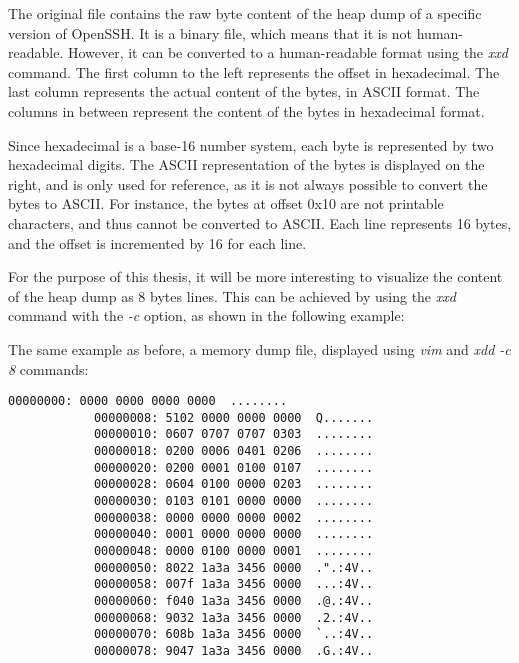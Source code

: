     The original file contains the raw byte content of the heap dump of a specific version of OpenSSH. It is a binary file, which means that it is not human-readable. However, it can be converted to a human-readable format using the \textit{xxd} command. The first column to the left represents the offset in hexadecimal. The last column represents the actual content of the bytes, in ASCII format. The columns in between represent the content of the bytes in hexadecimal format.

    Since hexadecimal is a base-16 number system, each byte is represented by two hexadecimal digits. The ASCII representation of the bytes is displayed on the right, and is only used for reference, as it is not always possible to convert the bytes to ASCII. For instance, the bytes at offset 0x10 are not printable characters, and thus cannot be converted to ASCII. Each line represents 16 bytes, and the offset is incremented by 16 for each line.

    For the purpose of this thesis, it will be more interesting to visualize the content of the heap dump as 8 bytes lines. This can be achieved by using the \textit{xxd} command with the \textit{-c} option, as shown in the following example:

    \begin{minipage}{\dimexpr\linewidth-20pt}
        The same example as before, a memory dump file, displayed using \textit{vim} and \textit{xdd -c 8} commands:

        \begin{lstlisting}[style=hexdump, caption={Hex Dump}]
            00000000: 0000 0000 0000 0000  ........
            00000008: 5102 0000 0000 0000  Q.......
            00000010: 0607 0707 0707 0303  ........
            00000018: 0200 0006 0401 0206  ........
            00000020: 0200 0001 0100 0107  ........
            00000028: 0604 0100 0000 0203  ........
            00000030: 0103 0101 0000 0000  ........
            00000038: 0000 0000 0000 0002  ........
            00000040: 0001 0000 0000 0000  ........
            00000048: 0000 0100 0000 0001  ........
            00000050: 8022 1a3a 3456 0000  .".:4V..
            00000058: 007f 1a3a 3456 0000  ...:4V..
            00000060: f040 1a3a 3456 0000  .@.:4V..
            00000068: 9032 1a3a 3456 0000  .2.:4V..
            00000070: 608b 1a3a 3456 0000  `..:4V..
            00000078: 9047 1a3a 3456 0000  .G.:4V..
        \end{lstlisting}
    \end{minipage}

